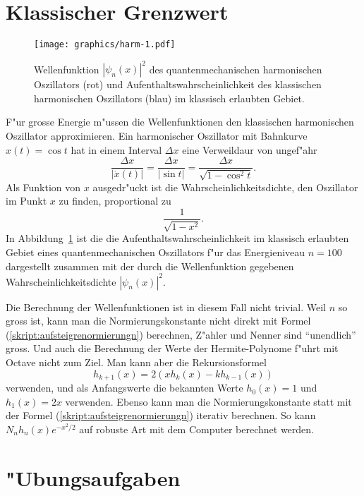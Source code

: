 \section{Klassischer Grenzwert}
\begin{figure}
\centering
\texttt{[image: graphics/harm-1.pdf]}
\caption{Wellenfunktion $|\psi_n(x)|^2$ des quantenmechanischen 
harmonischen Oszillators (rot) und Aufenthaltswahrscheinlichkeit des
klassischen harmonischen Oszillators (blau) im klassisch erlaubten
Gebiet.
\label{skript:harmklass}}
\end{figure}
F"ur grosse Energie m"ussen die Wellenfunktionen den klassischen
harmonischen Oszillator approximieren.
Ein harmonischer Oszillator mit Bahnkurve $x(t)=\cos t$ hat in einem
Interval $\Delta x$ eine Verweildaur von ungef"ahr
\[
\frac{\Delta x}{|\dot x(t)|}=\frac{\Delta x}{|\sin t|}
=\frac{\Delta x}{\sqrt{1-\cos^2t}}.
\]
Als Funktion von $x$ ausgedr"uckt ist die Wahrscheinlichkeitsdichte,
den Oszillator im Punkt $x$ zu finden, proportional zu
\[
\frac{1}{\sqrt{1-x^2}}.
\]
In Abbildung~\ref{skript:harmklass} ist die die Aufenthaltswahrscheinlichkeit
im klassisch erlaubten Gebiet eines quantenmechanischen Oszillators f"ur
das Energieniveau $n=100$ dargestellt zusammen mit der durch die
Wellenfunktion gegebenen Wahrscheinlichkeitsdichte $|\psi_n(x)|^2$.

Die Berechnung der Wellenfunktionen ist in diesem Fall nicht trivial.
Weil $n$ so gross ist, kann man die Normierungskonstante nicht direkt
mit Formel (\ref{skript:aufsteigrenormierungn}) berechnen, Z"ahler und
Nenner sind ``unendlich'' gross.
Und auch die Berechnung der Werte der Hermite-Polynome f"uhrt mit Octave
nicht zum Ziel.
Man kann aber die Rekursionsformel
\[
h_{k+1}(x) = 2 (x h_k(x) - k h_{k-1}(x))
\]
verwenden, und als Anfangswerte die bekannten Werte $h_0(x)=1$ und $h_1(x)=2x$
verwenden.
Ebenso kann man die Normierungskonstante statt mit der Formel
(\ref{skript:aufsteigrenormierungn}) iterativ berechnen.
So kann $N_nh_n(x)e^{-x^2/2}$ auf robuste Art mit dem Computer berechnet
werden.


\section*{"Ubungsaufgaben}
\begin{uebungsaufgaben}
\item

\item

\end{uebungsaufgaben}

